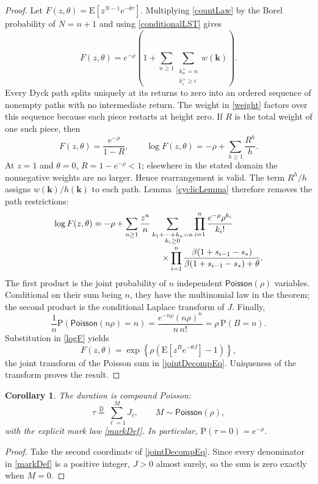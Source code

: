 \documentclass[11pt]{article}
\newcommand{\E}[1]{\mathrm{E}\left[#1\right]}
\newcommand{\PP}[1]{\mathrm{P}\left(#1\right)}
\newtheorem{corollary}{Corollary}
\begin{document}
\begin{proof}
Let $F(z,\theta)=\E{z^{N-1}e^{-\theta\tau}}$. Multiplying
\eqref{countLaw} by the Borel probability of $N=n+1$ and using
\eqref{conditionalLST} gives
\[
F(z,\theta)=e^{-\rho}
\left(1+\sum_{n\ge1}\sum_{\substack{k_n^+=n\\k_i^+\ge i}}
w(\mathbf k)\right).
\]
Every Dyck path splits uniquely at its returns to zero into an ordered
sequence of nonempty paths with no intermediate return. The weight in
\eqref{weight} factors over this sequence because each piece restarts
at height zero. If $R$ is the total weight of one such piece, then
\[
F(z,\theta)=\frac{e^{-\rho}}{1-R},
\qquad
\log F(z,\theta)=-\rho+\sum_{h\ge1}\frac{R^h}{h}.
\]
At $z=1$ and $\theta=0$, $R=1-e^{-\rho}<1$; elsewhere in the stated
domain the nonnegative weights are no larger. Hence rearrangement is
valid. The term $R^h/h$ assigns $w(\mathbf k)/h(\mathbf k)$ to each
path. Lemma~\ref{cyclicLemma} therefore removes the path restrictions:
\begin{align}\label{logF}
\log F(z,\theta)
&=-\rho+\sum_{n\ge1}\frac{z^n}{n}
\sum_{\substack{k_1+\cdots+k_n=n\\k_i\ge0}}
\prod_{i=1}^n\frac{e^{-\rho}\rho^{k_i}}{k_i!}\nonumber\\[-2pt]
&\hspace{28mm}\times
\prod_{i=1}^n
\frac{\beta(1+s_{i-1}-s_*)}
{\beta(1+s_{i-1}-s_*)+\theta}.
\end{align}
The first product is the joint probability of $n$ independent
$\mathsf{Poisson}(\rho)$ variables. Conditional on their sum being
$n$, they have the multinomial law in the theorem; the second product
is the conditional Laplace transform of $J$. Finally,
\[
\frac1n\PP{\mathsf{Poisson}(n\rho)=n}
=\frac{e^{-n\rho}(n\rho)^n}{n\,n!}
=\rho\,\PP{B=n}.
\]
Substitution in \eqref{logF} yields
\[
F(z,\theta)=
\exp\left\{\rho\left(\E{z^B e^{-\theta J}}-1\right)\right\},
\]
the joint transform of the Poisson sum in \eqref{jointDecompEq}.
Uniqueness of the transform proves the result.
\end{proof}

\begin{corollary}\label{durationDecomp}
The duration is compound Poisson:
\[
\tau\stackrel{\mathsf D}{=}\sum_{\ell=1}^M J_\ell,
\qquad M\sim\mathsf{Poisson}(\rho),
\]
with the explicit mark law \eqref{markDef}. In particular,
$\PP{\tau=0}=e^{-\rho}$.
\end{corollary}
\begin{proof}
Take the second coordinate of \eqref{jointDecompEq}. Since every
denominator in \eqref{markDef} is a positive integer, $J>0$ almost
surely, so the sum is zero exactly when $M=0$.
\end{proof}
\end{document}
